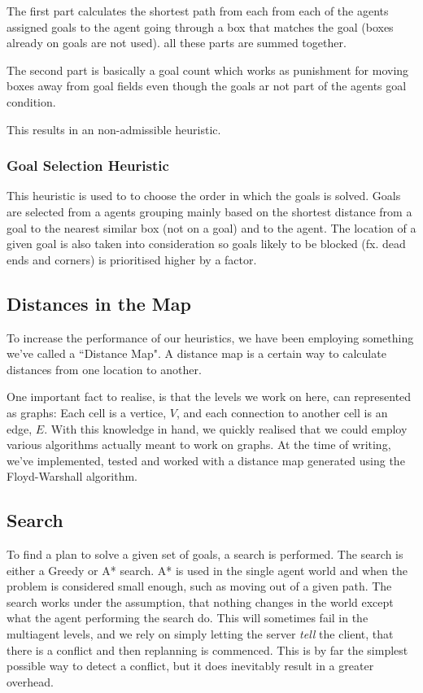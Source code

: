 \documentclass[letterpaper]{article}
\begin{document}
			The first part calculates the shortest path from each from each of the agents assigned goals to the agent going through a box that matches the goal (boxes already on goals are not used). all these parts are summed together.
			
			The second part is basically a goal count which works as punishment for moving boxes away from goal fields even though the goals ar not part of the agents goal condition.
			
			This results in an non-admissible heuristic.
		
		\subsubsection{Goal Selection Heuristic}\label{goal2}
			This heuristic is used to to choose the order in which the goals is solved. Goals are selected from a agents grouping mainly based on the shortest distance from a goal to the nearest similar box (not on a goal) and to the agent. The location of a given goal is also taken into consideration so goals likely to be blocked (fx. dead ends and corners) is prioritised higher by a factor.

				
			
	\subsection{Distances in the Map}
		To increase the performance of our heuristics, we have been employing something we've called a ``Distance Map". A distance map is a certain way to calculate distances from one location to another.
			
		One important fact to realise, is that the levels we work on here, can represented as graphs: Each cell is a vertice, $V$, and each connection to another cell is an edge, $E$. With this knowledge in hand, we quickly realised that we could employ various algorithms actually meant to work on graphs. At the time of writing, we've implemented, tested and worked with a distance map generated using the Floyd-Warshall algorithm.

	\subsection{Search}
		\label{sec:search}
		To find a plan to solve a given set of goals, a search is performed. The search is either a Greedy or A* search. A* is used in the single agent world and when the problem is considered small enough, such as moving out of a given path. 
		The search works under the assumption, that nothing changes in the world except what the agent performing the search do. This will sometimes fail in the multiagent levels, and we rely on simply letting the server \emph{tell} the client, that there is a conflict and then replanning is commenced. This is by far the simplest possible way to detect a conflict, but it does inevitably result in a greater overhead. 
		
\end{document}
